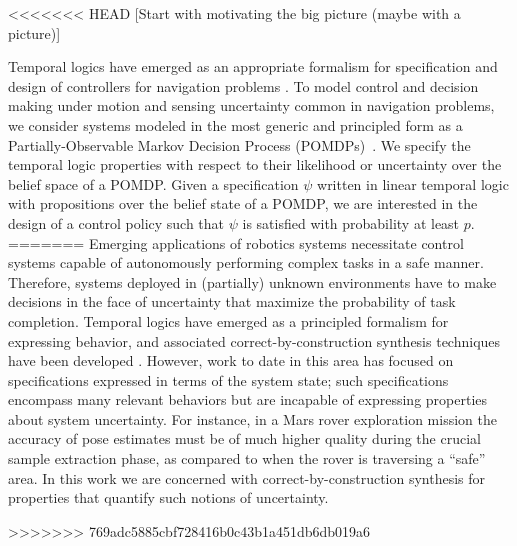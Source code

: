 \documentclass{ifacconf}
\newcommand{\red}[1]{{\color{red} #1}}
\begin{document}
<<<<<<< HEAD
\red{[Start with motivating the big picture (maybe with a picture)]}

Temporal logics have emerged as an appropriate formalism for specification and design of controllers for navigation problems \citep{Murray2009}. To model control and decision making under motion and sensing uncertainty common in navigation problems, we consider systems modeled in the most generic and principled form as a Partially-Observable Markov Decision Process (POMDPs)~\citep{Kaelbling98,Smallwood73}. We specify the temporal logic properties with respect to their likelihood or uncertainty over the belief space of a POMDP.  %
Given a specification $\psi$  written in linear temporal logic with propositions over the belief state of a POMDP, we are interested in the design of a control policy %
such that  $\psi$ is satisfied with probability at least $p$.
=======
Emerging applications of robotics systems necessitate control systems capable of autonomously performing complex tasks in a safe manner. Therefore, systems deployed in (partially) unknown environments have to make decisions in the face of uncertainty that maximize the probability of task completion. Temporal logics have emerged as a principled formalism for expressing behavior, and associated correct-by-construction synthesis techniques have been developed \citep{Murray2009}. However, work to date in this area has focused on specifications expressed in terms of the system state; such specifications encompass many relevant behaviors but are incapable of expressing properties about system uncertainty. For instance, in a Mars rover exploration mission the accuracy of pose estimates must be of much higher quality during the crucial sample extraction phase, as compared to when the rover is traversing a ``safe'' area. In this work we are concerned with correct-by-construction synthesis for properties that quantify such notions of uncertainty.
 
>>>>>>> 769adc5885cbf728416b0c43b1a451db6db019a6
\end{document}
